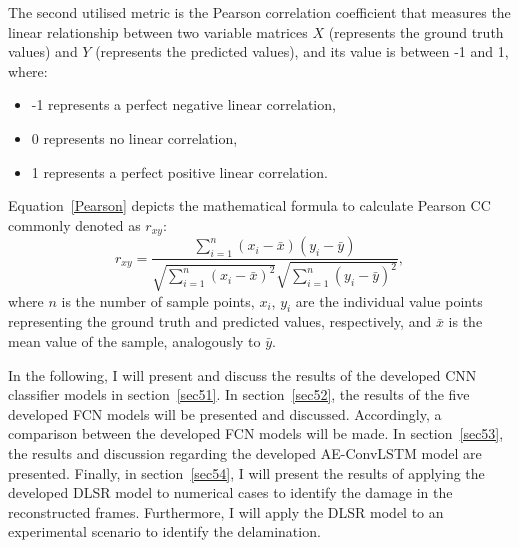 The second utilised metric is the Pearson correlation coefficient that measures the linear relationship between two variable matrices \textbf{\(X\)} (represents the ground truth values) and \textbf{\(Y\)} (represents the predicted values), and its value is between -1 and 1, where:
\begin{itemize}
	\item -1 represents a perfect negative linear correlation,
	\item 0 represents no linear correlation,
	\item 1 represents a perfect positive linear correlation.
\end{itemize}
Equation~\ref{Pearson} depicts the mathematical formula to calculate Pearson CC commonly denoted as \(r_{xy}\):
\begin{equation}
	r_{xy} = \frac{\sum_{i=1}^{n}(x_i - \bar{x})(y_i-\bar{y})}{\sqrt{\sum_{i=1}^{n}(x_i - \bar{x})^2}\sqrt{\sum_{i=1}^{n}(y_i - \bar{y})^2}},
	\label{Pearson}
\end{equation}
where \(n\) is the number of sample points, \(x_i\), \(y_i\) are the individual value points representing the ground truth and predicted values, respectively, and \(\bar{x}\) is the mean value of the sample, analogously to \(\bar{y}\).


In the following, I will present and discuss the results of the developed CNN classifier models in section~\ref{sec51}. 
In section~\ref{sec52}, the results of the five developed FCN models will be presented and discussed.
Accordingly, a comparison between the developed FCN models will be made.
In section~\ref{sec53}, the results and discussion regarding the developed AE-ConvLSTM model are presented.
Finally, in section~\ref{sec54}, I will present the results of applying the developed DLSR model to numerical cases to identify the damage in the reconstructed frames.
Furthermore, I will apply the DLSR model to an experimental scenario to identify the delamination.





